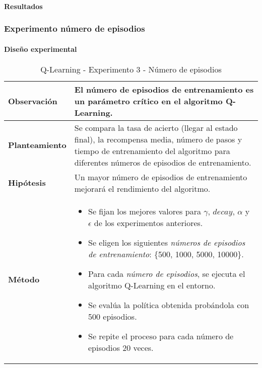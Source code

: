 \paragraph{Resultados}

\subsubsection{Experimento número de episodios}

\paragraph{Diseño experimental}

\begin{table}[H]
    \centering
    \begin{tabularx}{\textwidth}{|p{4cm}|X|} %
        \hline %
        \textbf{Observación} & El número de episodios de entrenamiento es un parámetro crítico en el algoritmo Q-Learning.
        \\ \hline
        \textbf{Planteamiento} & Se compara la tasa de acierto (llegar al estado final), la recompensa media, número de pasos y tiempo de entrenamiento del algoritmo para diferentes números de episodios de entrenamiento.
        \\ \hline
        \textbf{Hipótesis} & Un mayor número de episodios de entrenamiento mejorará el rendimiento del algoritmo.
        \\ \hline
        \textbf{Método} &
        \begin{itemize}
            \item Se fijan los mejores valores para \(\gamma\), $decay$, \(\alpha\) y \(\epsilon\) de los experimentos anteriores.
            \item Se eligen los siguientes \textit{números de episodios de entrenamiento}: \{500, 1000, 5000, 10000\}.
            \item Para cada \textit{número de episodios}, se ejecuta el algoritmo Q-Learning en el entorno.
            \item Se evalúa la política obtenida probándola con 500 episodios.
            \item Se repite el proceso para cada número de episodios 20 veces.
        \end{itemize}
        \\ \hline
    \end{tabularx}
    \caption{Q-Learning - Experimento 3 - Número de episodios}
    \label{tab:diseñoQLEarningExp3}
\end{table}


